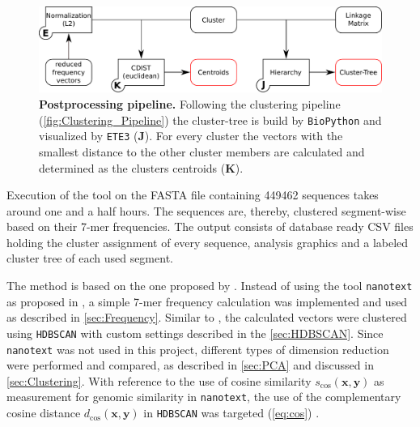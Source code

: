 \begin{figure}[!hbt]
    \centering
    \includegraphics[width=\textwidth]{Graphics/Tree.pdf}
    \caption[Postprocessing pipeline]{\textbf{Postprocessing pipeline.} Following the clustering pipeline (\autoref{fig:Clustering_Pipeline}) the cluster-tree is build by \texttt{BioPython} and visualized by \texttt{ETE3} (\textsf{\textbf{J}}). For every cluster the vectors with the smallest distance to the other cluster members are calculated and determined as the clusters centroids (\textsf{\textbf{K}}).}
    \label{fig:Tree_Pipeline}
\end{figure}

Execution of the tool on the FASTA file containing 449462 sequences takes around one and a half hours. The sequences are, thereby, clustered segment-wise based on their 7-mer frequencies. The output consists of database ready CSV files holding the cluster assignment of every sequence, analysis graphics and a labeled cluster tree of each used segment. 

\vspace{1em}

The method is based on the one proposed by \textcite{viehweger_addressing_2019}. Instead of using the tool \texttt{nanotext} as proposed in \textcite{viehweger_encoding_2019}, a simple 7-mer frequency calculation was implemented and used as described in \autoref{sec:Frequency}. Similar to \textcite{viehweger_addressing_2019}, the calculated vectors were clustered using \texttt{HDBSCAN} with custom settings described in the \autoref{sec:HDBSCAN}. Since \texttt{nanotext} was not used in this project, different types of dimension reduction were performed and compared, as described in \autoref{sec:PCA} and discussed in \autoref{sec:Clustering}. With reference to the use of cosine similarity $s_{\text{cos}}(\mathbf{x}, \mathbf{y})$ as measurement for genomic similarity in \texttt{nanotext}, the use of the complementary cosine distance $d_{\text{cos}}(\mathbf{x}, \mathbf{y})$ in \texttt{HDBSCAN} was targeted (\autoref{eq:cos}) \autocite{viehweger_encoding_2019}. %

